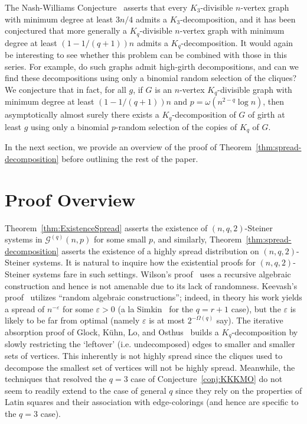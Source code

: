 \documentclass[11pt]{article}
\numberwithin{equation}{section}
\newcounter{i}
\theoremstyle{plain}
\theoremstyle{plain} %
\theoremstyle{definition}
\begin{document}
The Nash-Williams Conjecture~\cite{N-W70} asserts that every $K_3$-divisible $n$-vertex graph with minimum degree at least $3n/4$ admits a $K_3$-decomposition, and it has been conjectured \cite{Gu91, BKLO16} that more generally a $K_q$-divisible $n$-vertex graph with minimum degree at least $(1 - 1/(q + 1))n$ admits a $K_q$-decomposition.  It would again be interesting to see whether this problem can be combined with those in this series.  For example, do such graphs admit high-girth decompositions, and can we find these decompositions using only a binomial random selection of the cliques?  We conjecture that in fact, for all $g$, if $G$ is an $n$-vertex $K_q$-divisible graph with minimum degree at least $(1 - 1/(q + 1))n$ and $p = \omega(n^{2-q}\log n)$, then asymptotically almost surely there exists a $K_q$-decomposition of $G$ of girth at least $g$ using only a binomial $p$-random selection of the copies of $K_q$ of $G$.

In the next section, we provide an overview of the proof of Theorem~\ref{thm:spread-decomposition} before outlining the rest of the paper.


\section{Proof Overview}\label{s:Overview}

Theorem~\ref{thm:ExistenceSpread} asserts the existence of $(n,q,2)$-Steiner systems in $\mathcal{G}^{(q)}(n,p)$ for some small $p$, and similarly, Theorem~\ref{thm:spread-decomposition} asserts the existence of a highly spread distribution on $(n,q,2)$-Steiner systems. It is natural to inquire how the existential proofs for $(n,q,2)$-Steiner systems fare in such settings. Wilson's proof~\cite{WiI,WiII,WiIII} uses a recursive algebraic construction and hence is not amenable due to its lack of randomness. Keevash's proof~\cite{K14} utilizes ``random algebraic constructions''; indeed, in theory his work yields a spread of $n^{-\varepsilon}$ for some $\varepsilon > 0$ (a la Simkin~\cite{S17} for the $q=r+1$ case), but the $\varepsilon$ is likely to be far from optimal (namely $\varepsilon$ is at most $2^{-\Omega(q)}$ say). The iterative absorption proof of Glock, K\"uhn, Lo, and Osthus~\cite{GKLO16} builds a $K_q$-decomposition by slowly restricting the `leftover' (i.e. undecomposed) edges to smaller and smaller sets of vertices. This inherently is not highly spread since the cliques used to decompose the smallest set of vertices will not be highly spread. 
Meanwhile, the techniques that resolved the $q=3$ case of Conjecture~\ref{conj:KKKMO} do not seem to readily extend to the case of general $q$ since they rely on the properties of Latin squares and their association with edge-colorings (and hence are specific to the $q=3$ case). 
\end{document}

